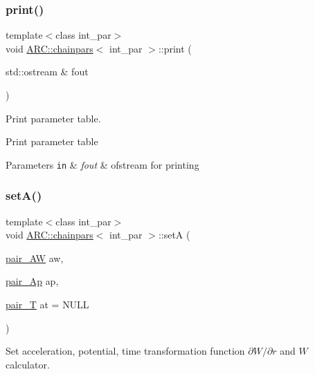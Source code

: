 \subsubsection{\texorpdfstring{print()}{print()}}
{\footnotesize\ttfamily template$<$class int\+\_\+par$>$ \\
void \hyperlink{classARC_1_1chainpars}{A\+R\+C\+::chainpars}$<$ int\+\_\+par $>$\+::print (\begin{DoxyParamCaption}\item[{std\+::ostream \&}]{fout }\end{DoxyParamCaption})\hspace{0.3cm}{\ttfamily [inline]}}



Print parameter table. 

Print parameter table 
\begin{DoxyParams}[1]{Parameters}
\mbox{\tt in}  & {\em fout} & ofstream for printing \\
\hline
\end{DoxyParams}
\hypertarget{classARC_1_1chainpars_a8fb0855614ac2b2e527c43ce5d66ca0d}{}\label{classARC_1_1chainpars_a8fb0855614ac2b2e527c43ce5d66ca0d} 
\subsubsection{\texorpdfstring{set\+A()}{setA()}}
{\footnotesize\ttfamily template$<$class int\+\_\+par$>$ \\
void \hyperlink{classARC_1_1chainpars}{A\+R\+C\+::chainpars}$<$ int\+\_\+par $>$\+::setA (\begin{DoxyParamCaption}\item[{\hyperlink{classARC_1_1chainpars_a9558124278a55c0301642e1df63be063}{pair\+\_\+\+AW}}]{aw,  }\item[{\hyperlink{classARC_1_1chainpars_a80fcc6e3b5ce69025126bc49d90f233c}{pair\+\_\+\+Ap}}]{ap,  }\item[{\hyperlink{classARC_1_1chainpars_a860194e916f3ae900e93beedd277fa3c}{pair\+\_\+T}}]{at = {\ttfamily NULL} }\end{DoxyParamCaption})\hspace{0.3cm}{\ttfamily [inline]}}



Set acceleration, potential, time transformation function $\partial W/\partial r$ and $W$ calculator. 

